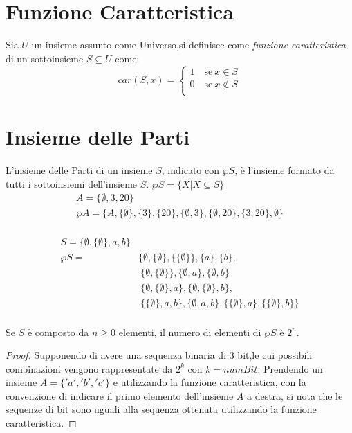 \section{Funzione Caratteristica}
Sia $U$ un insieme assunto come Universo,si definisce come \emph{funzione caratteristica}
di un sottoinsieme $S \subseteq U$ come:
\begin{equation*}
    car(S,x) = \begin{cases} 1 \quad \text{se} \ x \in S \\
                             0 \quad \text{se} \ x \not \in S\\
               \end{cases}
\end{equation*}

\section{Insieme delle Parti}
L'insieme delle Parti di un insieme $S$, indicato con $\wp S$, è l'insieme formato
da tutti i sottoinsiemi dell'insieme $S$. \newline
$\wp S = \{X | X \subseteq S\} $
\begin{align*}
A = \{\emptyset,3,20 \} \\
\wp A = \{A,\{\emptyset\},\{ 3\},\{ 20 \},\{ \emptyset,3 \},\{\emptyset,20 \},\{3,20\},\emptyset \} \\
\end{align*}

\begin{align*}
S = \{ \emptyset, \{ \emptyset \}, a,b\} \\
\wp S = & \{ \emptyset,\{\emptyset \},\{\{\emptyset\}\},\{a\},\{b\}, \\
        & \ \{ \emptyset,\{\emptyset\}\}, \{ \emptyset,a\},\{ \emptyset,b\} \\
        & \ \{ \emptyset,\{\emptyset\},a\},\{\emptyset,\{\emptyset\},b\}, \\
        & \ \{ \{\emptyset\},a,b\},\{ \emptyset,a,b\},\{\{\emptyset\},a\},\{\{\emptyset\},b\} \} \\
\end{align*}

\begin{defi}
Se $S$ è composto da $n \geq 0$ elementi, il numero di elementi di $\wp S$ è $2 ^ n$.
\end{defi}
\begin{proof}
Supponendo di avere una sequenza binaria di 3 bit,le cui possibili combinazioni
vengono rappresentate da $2 ^ k$ con $k = numBit$.\newline
Prendendo un insieme $A = \{'a','b','c' \}$ e utilizzando la funzione caratteristica,
con la convenzione di indicare il primo elemento dell'insieme $A$ a destra, si nota
che le sequenze di bit sono uguali alla sequenza ottenuta utilizzando la funzione caratteristica.
\end{proof}
